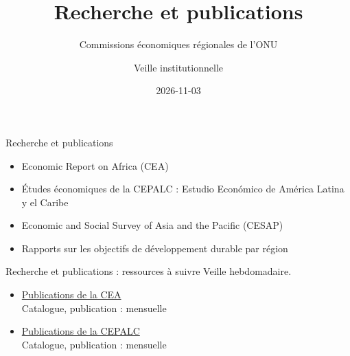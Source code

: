 \documentclass[aspectratio=169,11pt]{beamer}
\title{Recherche et publications}
\subtitle{Commissions économiques régionales de l'ONU}
\author{Veille institutionnelle}
\date{2026-11-03}
\begin{document}
\begin{frame}\titlepage\end{frame}

\begin{frame}{Recherche et publications}
\begin{itemize}
\item Economic Report on Africa (CEA)
\item Études économiques de la CEPALC : Estudio Económico de América Latina y el Caribe
\item Economic and Social Survey of Asia and the Pacific (CESAP)
\item Rapports sur les objectifs de développement durable par région
\end{itemize}
\end{frame}

\begin{frame}{Recherche et publications : ressources à suivre}
\small
Veille hebdomadaire.
\begin{itemize}
\item \href{https://www.uneca.org/publications}{Publications de la CEA}\\{\footnotesize Catalogue, publication : mensuelle}
\item \href{https://www.cepal.org/en/publications}{Publications de la CEPALC}\\{\footnotesize Catalogue, publication : mensuelle}
\end{itemize}
\end{frame}
\end{document}

